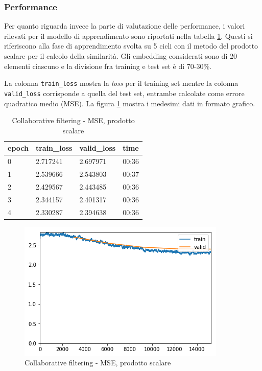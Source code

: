 \documentclass[hidelinks, 12pt]{article}
\begin{document}
\subsubsection{Performance}

Per quanto riguarda invece la parte di valutazione delle performance, i valori rilevati per il modello di apprendimento sono riportati nella tabella \ref{tab:collab-dot-loss}. Questi si riferiscono alla fase di apprendimento svolta su 5 cicli con il metodo del prodotto scalare per il calcolo della similarità. Gli embedding considerati sono di 20 elementi ciascuno e la divisione fra training e test set è di 70-30\%.

La colonna \texttt{train\_loss} mostra la \textit{loss} per il training set mentre la colonna \texttt{valid\_loss} corrisponde a quella del test set, entrambe calcolate come errore quadratico medio (MSE). La figura \ref{fig:collab-dot-loss} mostra i medesimi dati in formato grafico.

\begin{table}[H]
	\caption{Collaborative filtering - MSE, prodotto scalare}\label{tab:collab-dot-loss}
	\centering
	\begin{tabular}{|l|l|l|l|}
		\hline
		epoch & train\_loss & valid\_loss & time \\ 
		\hline
		0 & 2.717241 & 2.697971 & 00:36 \\ 
		1 & 2.539666 & 2.543803 & 00:37 \\ 
		2 & 2.429567 & 2.443485 & 00:36 \\ 
		3 & 2.344157 & 2.401317 & 00:36 \\ 
		4 & 2.330287 & 2.394638 & 00:36 \\ 
		\hline
	\end{tabular}
\end{table}

\begin{figure}[H]
	\centering
	\includegraphics[scale=0.6]{images/07_02_loss_dot.png}
	\caption[Collaborative filtering - MSE, prodotto scalare]{Collaborative filtering - MSE, prodotto scalare}
	\label{fig:collab-dot-loss}
\end{figure}
\end{document}
